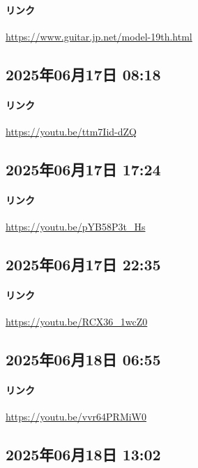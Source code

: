 \paragraph{リンク}
\url{https://www.guitar.jp.net/model-19th.html}

\subsection*{2025年06月17日 08:18}

\paragraph{リンク}
\url{https://youtu.be/ttm7Iid-dZQ}

\subsection*{2025年06月17日 17:24}

\paragraph{リンク}
\url{https://youtu.be/pYB58P3t_Hs}

\subsection*{2025年06月17日 22:35}

\paragraph{リンク}
\url{https://youtu.be/RCX36_1wcZ0}

\subsection*{2025年06月18日 06:55}

\paragraph{リンク}
\url{https://youtu.be/vvr64PRMiW0}

\subsection*{2025年06月18日 13:02}

